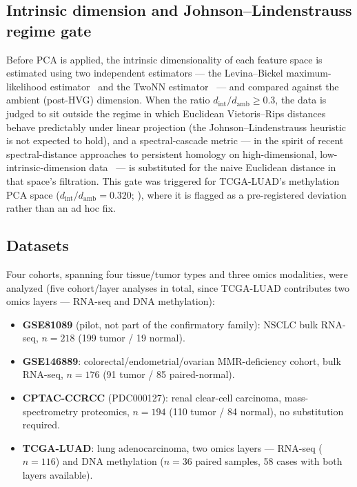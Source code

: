 \subsection{Intrinsic dimension and Johnson--Lindenstrauss regime gate}

Before PCA is applied, the intrinsic dimensionality of each feature space is estimated using two independent estimators --- the Levina--Bickel maximum-likelihood estimator~\cite{levinabickel2004} and the TwoNN estimator~\cite{facco2017} --- and compared against the ambient (post-HVG) dimension. When the ratio $d_{\text{int}}/d_{\text{amb}} \geq 0.3$, the data is judged to sit outside the regime in which Euclidean Vietoris--Rips distances behave predictably under linear projection (the Johnson--Lindenstrauss heuristic~\cite{johnsonlindenstrauss1984} is not expected to hold), and a spectral-cascade metric --- in the spirit of recent spectral-distance approaches to persistent homology on high-dimensional, low-intrinsic-dimension data~\cite{damrich2024} --- is substituted for the naive Euclidean distance in that space's filtration. This gate was triggered for TCGA-LUAD's methylation PCA space ($d_{\text{int}}/d_{\text{amb}} = 0.320$; ), where it is flagged as a pre-registered deviation rather than an ad hoc fix.

\subsection{Datasets}

Four cohorts, spanning four tissue/tumor types and three omics modalities, were analyzed (five cohort/layer analyses in total, since TCGA-LUAD contributes two omics layers --- RNA-seq and DNA methylation):

\begin{itemize}
\item \textbf{GSE81089} (pilot, not part of the confirmatory family): NSCLC bulk RNA-seq, $n=218$ (199 tumor / 19 normal).
\item \textbf{GSE146889}: colorectal/endometrial/ovarian MMR-deficiency cohort, bulk RNA-seq, $n=176$ (91 tumor / 85 paired-normal).
\item \textbf{CPTAC-CCRCC} (PDC000127): renal clear-cell carcinoma, mass-spectrometry proteomics, $n=194$ (110 tumor / 84 normal), no substitution required.
\item \textbf{TCGA-LUAD}: lung adenocarcinoma, two omics layers --- RNA-seq ($n=116$) and DNA methylation ($n=36$ paired samples, 58 cases with both layers available).
\end{itemize}

